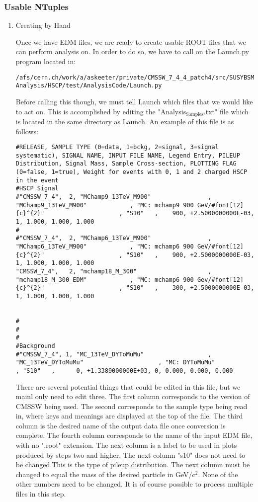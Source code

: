 \documentclass[11pt]{article}
\begin{document}
\subsubsection{Usable NTuples}
\label{sec-1-1-4}
\begin{enumerate}
\item Creating by Hand
\label{sec-1-1-4-1}

Once we have EDM files, we are ready to create usable ROOT files
that we can perform analysis on. In order to do so, we have to
call on the Launch.py program located in:

\texttt{/afs/cern.ch/work/a/askeeter/private/CMSSW\_7\_4\_4\_patch4/src/SUSYBSMAnalysis/HSCP/test/AnalysisCode/Launch.py}

Before calling this though, we must tell Launch which files that
we would like to act on. This is accomplished by editing the
"Analysis$_{\text{Samples}}$.txt" file which is located in the same directory
as Launch. An example of this file is as follows:

\begin{verbatim}
#RELEASE, SAMPLE TYPE (0=data, 1=bckg, 2=signal, 3=signal systematic), SIGNAL NAME, INPUT FILE NAME, Legend Entry, PILEUP Distribution, Signal Mass, Sample Cross-section, PLOTTING FLAG (0=false, 1=true), Weight for events with 0, 1 and 2 charged HSCP in the event
#HSCP Signal
#"CMSSW_7_4",  2, "MChamp9_13TeV_M900"                , "MChamp9_13TeV_M900"            , "MC: mchamp9 900 GeV/#font[12]{c}^{2}"                     , "S10"   ,    900, +2.5000000000E-03, 1, 1.000, 1.000, 1.000
#
#"CMSSW_7_4",  2, "MChamp6_13TeV_M900"                , "MChamp6_13TeV_M900"            , "MC: mchamp6 900 GeV/#font[12]{c}^{2}"                     , "S10"   ,    900, +2.5000000000E-03, 1, 1.000, 1.000, 1.000
"CMSSW_7_4",   2, "mchamp18_M_300"                    , "mchamp18_M_300_EDM"            , "MC: mchamp6 900 Gev/#font[12]{c}^{2}"                     , "S10"   ,    300, +2.5000000000E-03, 1, 1.000, 1.000, 1.000


#
#
#
#Background
#"CMSSW_7_4", 1, "MC_13TeV_DYToMuMu"                  , "MC_13TeV_DYToMuMu"                     , "MC: DYToMuMu"                            , "S10"   ,      0, +1.3389000000E+03, 0, 0.000, 0.000, 0.000
\end{verbatim}

There are several potential things that could be edited in this
file, but we mainl only need to edit three. The first column
corresponds to the version of CMSSW being used. The second
corresponds to the sample type being read in, where keys and
meanings are displayed at the top of the file. The third column is
the desired name of the output data file once conversion is
complete. The fourth column corresponds to the name of the input
EDM file, with no ".root" extension. The next column is a label
to be used in plots produced by steps two and higher. The next
column "s10" does not need to be changed.This is the type of
pileup distribution. The next column must be changed to equal the
mass of the desired particle in GeV/c$^{\text{2}}$. None of the other numbers
need to be changed. It is of course possible to process multiple
files in this step. 


\end{enumerate}
\end{document}
